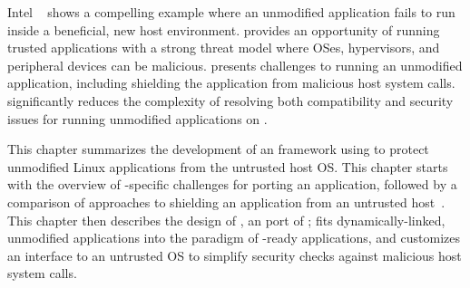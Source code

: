 Intel \sgx{}~\cite{intelsgx} shows
a compelling example
where an unmodified application fails to run inside a beneficial, new host environment.
\sgx{} provides an opportunity of running trusted applications with a strong threat model where
OSes, hypervisors, and peripheral devices can be malicious.
\sgx{} presents challenges to running an unmodified application, including shielding the application
from malicious host system calls.
\graphene{} significantly reduces the complexity
of resolving both compatibility and security issues for running unmodified applications on \sgx{}.


This chapter summarizes the development of an \sgx{} framework using \graphene{} to protect unmodified Linux applications from the untrusted host OS.
This chapter starts with the overview of \sgx{}-specific challenges
for porting an application,
followed by a comparison of approaches to shielding an application from an untrusted host~\cite{osdi16scone,shinde17panoply,baumann14haven}.
This chapter then describes the design of \graphenesgx{},
an \sgx{} port of \graphene{};
\graphenesgx{} fits dynamically-linked, unmodified applications into the paradigm of \sgx{}-ready applications,
and customizes an interface to an untrusted OS
to simplify security checks against malicious host system calls.
